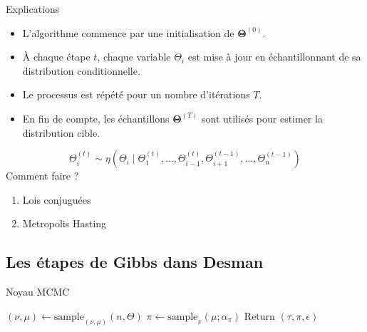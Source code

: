 \documentclass{beamer}
\newcommand{\code}[1]{\colorbox{light-gray}{\texttt{#1}}}
\newcommand{\fr}[1]{#1}
\newcommand{\en}[1]{}
\begin{document}
\begin{frame}{Explications}
    \begin{itemize}
        \item L'algorithme commence par une initialisation de $\mathbf{\Theta}^{(0)}$.
        \item À chaque étape $t$, chaque variable $\Theta_i$ est mise à jour en échantillonnant de sa distribution conditionnelle.
        \item Le processus est répété pour un nombre d'itérations $T$.
        \item En fin de compte, les échantillons $\mathbf{\Theta}^{(T)}$ sont utilisés pour estimer la distribution cible.
    \end{itemize}
\end{frame}



\begin{frame}
$$\Theta_i^{(t)} \sim \eta\left(\Theta_i \mid \Theta_1^{(t)}, \ldots, \Theta_{i-1}^{(t)}, \Theta_{i+1}^{(t-1)}, \ldots, \Theta_n^{(t-1)}\right)$$
Comment faire ?

\begin{enumerate}
\item Lois conjuguées
\item Metropolis Hasting
\end{enumerate}
\end{frame}

\subsection{Les étapes de Gibbs dans Desman}
\begin{frame}
    
\begin{algorithm}[H]
\caption{\en{MCMC kernel}\fr{Noyau MCMC}}\label{alg:mcmck}
\begin{algorithmic}
\State $(\nu,\mu)\gets{\mathrm{sample}_{(\nu,\mu)}(n,\Theta)}$
\State $\pi\gets\mathrm{sample}_\pi(\mu;\alpha_\pi)$
\State Return $\left(\tau,\pi,\epsilon\right)$
\EndProcedure
\end{algorithmic}
\end{algorithm}

\end{frame}
\end{document}
